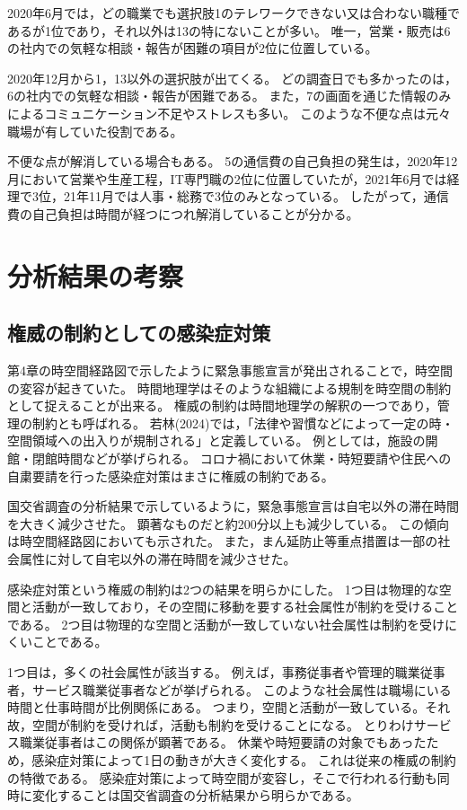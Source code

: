 \documentclass[paper={210mm,297mm},fontsize=15Q,line_length=35zw,number_of_lines=31,head_space=30mm,gutter=40mm,baselineskip=2.0zw,headfoot_verticalposition=1.5zw]{jlreq}
\begin{document}
2020年6月では，どの職業でも選択肢1のテレワークできない又は合わない職種であるが1位であり，それ以外は13の特にないことが多い。
唯一，営業・販売は6の社内での気軽な相談・報告が困難の項目が2位に位置している。

2020年12月から1，13以外の選択肢が出てくる。
どの調査日でも多かったのは，6の社内での気軽な相談・報告が困難である。
また，7の画面を通じた情報のみによるコミュニケーション不足やストレスも多い。
このような不便な点は元々職場が有していた役割である。

不便な点が解消している場合もある。
5の通信費の自己負担の発生は，2020年12月において営業や生産工程，IT専門職の2位に位置していたが，2021年6月では経理で3位，21年11月では人事・総務で3位のみとなっている。
したがって，通信費の自己負担は時間が経つにつれ解消していることが分かる。

\section{分析結果の考察}

\subsection{権威の制約としての感染症対策}

第4章の時空間経路図で示したように緊急事態宣言が発出されることで，時空間の変容が起きていた。
時間地理学はそのような組織による規制を時空間の制約として捉えることが出来る。
権威の制約は時間地理学の解釈の一つであり，管理の制約とも呼ばれる。
若林(2024)では，「法律や習慣などによって一定の時・空間領域への出入りが規制される」と定義している。
例としては，施設の開館・閉館時間などが挙げられる。
コロナ禍において休業・時短要請や住民への自粛要請を行った感染症対策はまさに権威の制約である。

国交省調査の分析結果で示しているように，緊急事態宣言は自宅以外の滞在時間を大きく減少させた。
顕著なものだと約200分以上も減少している。
この傾向は時空間経路図においても示された。
また，まん延防止等重点措置は一部の社会属性に対して自宅以外の滞在時間を減少させた。

感染症対策という権威の制約は2つの結果を明らかにした。
1つ目は物理的な空間と活動が一致しており，その空間に移動を要する社会属性が制約を受けることである。
2つ目は物理的な空間と活動が一致していない社会属性は制約を受けにくいことである。

1つ目は，多くの社会属性が該当する。
例えば，事務従事者や管理的職業従事者，サービス職業従事者などが挙げられる。
このような社会属性は職場にいる時間と仕事時間が比例関係にある。
つまり，空間と活動が一致している。それ故，空間が制約を受ければ，活動も制約を受けることになる。
とりわけサービス職業従事者はこの関係が顕著である。
休業や時短要請の対象でもあったため，感染症対策によって1日の動きが大きく変化する。
これは従来の権威の制約の特徴である。
感染症対策によって時空間が変容し，そこで行われる行動も同時に変化することは国交省調査の分析結果から明らかである。
\end{document}
